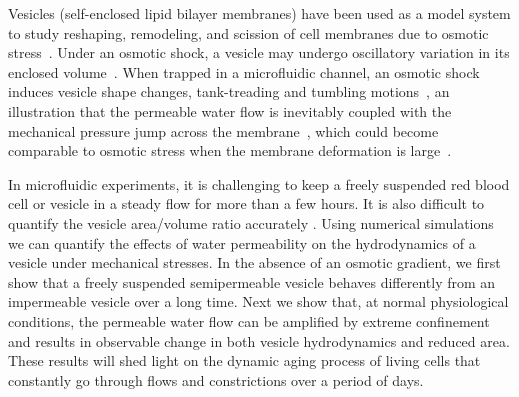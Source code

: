 \documentclass[9pt,twocolumn,twoside,lineno]{pnas-new}
\begin{document}


Vesicles (self-enclosed lipid bilayer membranes) have been
used as a model system to study reshaping, remodeling, and scission of
cell membranes due to osmotic stress~\cite{OgleckaEtAl2014_eLife,
CamposSaric2020_bioRxiv, Dimova2020_GVB, BhatiaChrist2020_SoftMatt}.
Under an osmotic shock, a vesicle may undergo oscillatory variation in
its enclosed volume~\cite{ChabanonHoLiedberg2017_BJ}. When trapped in a
microfluidic channel, an osmotic shock induces vesicle shape changes,
tank-treading and tumbling
motions~\cite{BhatiaRobinsonDimova2020_SoftMatt,
BhatiaChrist2020_SoftMatt}, an illustration that the permeable water
flow is inevitably coupled with the mechanical pressure jump across the
membrane~\cite{yao-mor2017}, which could become comparable to osmotic
stress when the membrane deformation is large~\cite{LiMoriSun2015_PRL,
yao-mor2017}. 

In microfluidic experiments, it is challenging to keep a freely
suspended red blood cell or vesicle in a steady flow for more than a few
hours. It is also difficult to quantify the vesicle area/volume ratio
accurately \cite{MinetttiCallensCoupier2008_AppliedOptics}.  Using numerical simulations we can quantify the effects of
water permeability on the hydrodynamics of a vesicle under mechanical
stresses. 
In the absence of an osmotic gradient, we first show that
a freely suspended semipermeable vesicle behaves differently from an
impermeable vesicle over a long time. Next we show that, at normal
physiological conditions, the permeable water flow can be amplified by
extreme confinement and results in observable change in both vesicle
hydrodynamics and reduced area. These results will shed light on the
dynamic aging process of living cells that constantly go through flows
and constrictions over a period of days.
 
\end{document}
